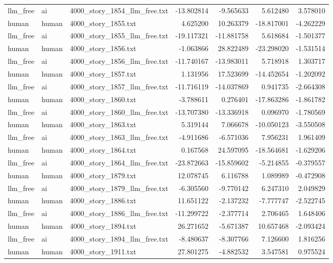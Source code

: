 \begin{longtable}{lllrrrr}
llm\_free & ai & 4000\_story\_1854\_llm\_free.txt & -13.802814 & -9.565633 & 5.612480 & 3.578010 \\
human & human & 4000\_story\_1855.txt & 4.625200 & 10.263379 & -18.817001 & -4.262229 \\
llm\_free & ai & 4000\_story\_1855\_llm\_free.txt & -19.117321 & -11.881758 & 5.618684 & -1.501377 \\
human & human & 4000\_story\_1856.txt & -1.063866 & 28.822489 & -23.298020 & -1.531514 \\
llm\_free & ai & 4000\_story\_1856\_llm\_free.txt & -11.740167 & -13.983011 & 5.718918 & 1.303717 \\
human & human & 4000\_story\_1857.txt & 1.131956 & 17.523699 & -14.452654 & -1.202092 \\
llm\_free & ai & 4000\_story\_1857\_llm\_free.txt & -11.716119 & -14.037869 & 0.941735 & -2.664308 \\
human & human & 4000\_story\_1860.txt & -3.788611 & 0.276401 & -17.863286 & -1.861782 \\
llm\_free & ai & 4000\_story\_1860\_llm\_free.txt & -13.707380 & -13.336918 & 0.096970 & -1.780569 \\
human & human & 4000\_story\_1863.txt & 5.319144 & 7.066678 & -10.050123 & -3.550508 \\
llm\_free & ai & 4000\_story\_1863\_llm\_free.txt & -4.911686 & -6.571036 & 7.956231 & 1.961409 \\
human & human & 4000\_story\_1864.txt & 0.167568 & 24.597095 & -18.564681 & -1.629206 \\
llm\_free & ai & 4000\_story\_1864\_llm\_free.txt & -23.872663 & -15.859602 & -5.214855 & -0.379557 \\
human & human & 4000\_story\_1879.txt & 12.078745 & 6.116788 & 1.089989 & -0.472908 \\
llm\_free & ai & 4000\_story\_1879\_llm\_free.txt & -6.305560 & -9.770142 & 6.247310 & 2.049829 \\
human & human & 4000\_story\_1886.txt & 11.651122 & -2.137232 & -7.777747 & -2.522745 \\
llm\_free & ai & 4000\_story\_1886\_llm\_free.txt & -11.299722 & -2.377714 & 2.706465 & 1.648406 \\
human & human & 4000\_story\_1894.txt & 26.271652 & -5.671387 & 10.657468 & -2.093424 \\
llm\_free & ai & 4000\_story\_1894\_llm\_free.txt & -8.480637 & -8.307766 & 7.126600 & 1.816256 \\
human & human & 4000\_story\_1911.txt & 27.801275 & -4.882532 & 3.547581 & 0.975524 \\

\end{longtable}
